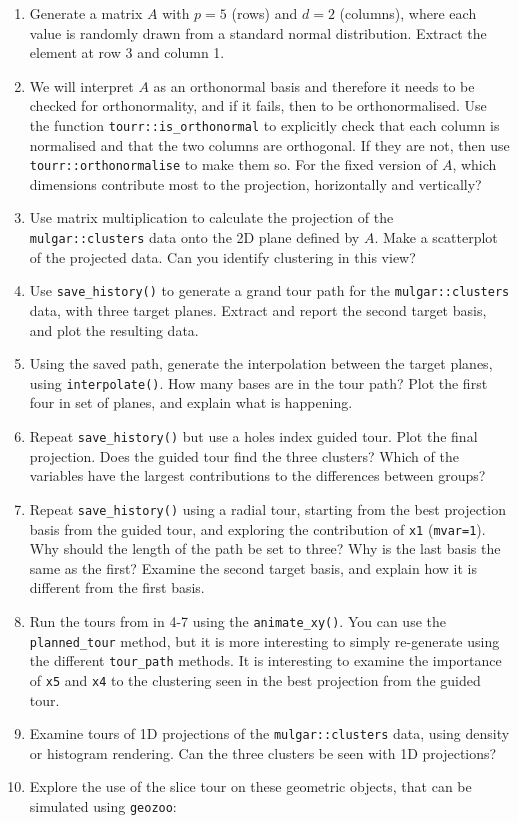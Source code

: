 \documentclass[
  letterpaper,
]{krantz}
\providecommand{\tightlist}{%
  \setlength{\itemsep}{0pt}\setlength{\parskip}{0pt}}
\begin{document}
\begin{enumerate}
\def\labelenumi{\arabic{enumi}.}
\tightlist
\item
  Generate a matrix \(A\) with \(p=5\) (rows) and \(d=2\) (columns),
  where each value is randomly drawn from a standard normal
  distribution. Extract the element at row 3 and column 1.
\item
  We will interpret \(A\) as an orthonormal basis and therefore it needs
  to be checked for orthonormality, and if it fails, then to be
  orthonormalised. Use the function \texttt{tourr::is\_orthonormal} to
  explicitly check that each column is normalised and that the two
  columns are orthogonal. If they are not, then use
  \texttt{tourr::orthonormalise} to make them so. For the fixed version
  of \(A\), which dimensions contribute most to the projection,
  horizontally and vertically?
\item
  Use matrix multiplication to calculate the projection of the
  \texttt{mulgar::clusters} data onto the 2D plane defined by \(A\).
  Make a scatterplot of the projected data. Can you identify clustering
  in this view?
\item
  Use \texttt{save\_history()} to generate a grand tour path for the
  \texttt{mulgar::clusters} data, with three target planes. Extract and
  report the second target basis, and plot the resulting data.
\item
  Using the saved path, generate the interpolation between the target
  planes, using \texttt{interpolate()}. How many bases are in the tour
  path? Plot the first four in set of planes, and explain what is
  happening.
\item
  Repeat \texttt{save\_history()} but use a holes index guided tour.
  Plot the final projection. Does the guided tour find the three
  clusters? Which of the variables have the largest contributions to the
  differences between groups?
\item
  Repeat \texttt{save\_history()} using a radial tour, starting from the
  best projection basis from the guided tour, and exploring the
  contribution of \texttt{x1} (\texttt{mvar=1}). Why should the length
  of the path be set to three? Why is the last basis the same as the
  first? Examine the second target basis, and explain how it is
  different from the first basis.
\item
  Run the tours from in 4-7 using the \texttt{animate\_xy()}. You can
  use the \texttt{planned\_tour} method, but it is more interesting to
  simply re-generate using the different \texttt{tour\_path} methods. It
  is interesting to examine the importance of \texttt{x5} and
  \texttt{x4} to the clustering seen in the best projection from the
  guided tour.
\item
  Examine tours of 1D projections of the \texttt{mulgar::clusters} data,
  using density or histogram rendering. Can the three clusters be seen
  with 1D projections?
\item
  Explore the use of the slice tour on these geometric objects, that can
  be simulated using \texttt{geozoo}:
\end{enumerate}
\end{document}
